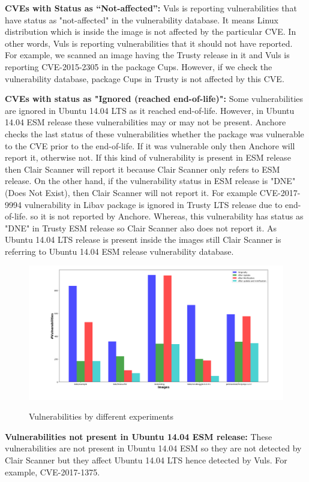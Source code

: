 \documentclass[a4paper,num-refs]{oup-contemporary}
\begin{document}
\textbf{CVEs with Status as “Not-affected”:} Vuls is reporting vulnerabilities that have status
as "not-affected" in the vulnerability database. It means Linux distribution which is inside the image is not affected
by the particular CVE. In other words, Vuls is reporting vulnerabilities that it should not have reported.
For example, we scanned an image having the Trusty release in it and Vuls is reporting CVE-2015-2305
in the package Cups. However, if we check the vulnerability database, package Cups in Trusty is not
affected by this CVE.

\textbf{CVEs with status as "Ignored (reached end-of-life)":}
Some vulnerabilities are ignored in Ubuntu 14.04 LTS as it reached end-of-life. 
However, in Ubuntu 14.04 ESM release these vulnerabilities may or may not be present.
Anchore checks the last status of these vulnerabilities whether the package was vulnerable to the CVE
prior to the end-of-life. If it was vulnerable only then Anchore will report it, otherwise not.
If this kind of vulnerability is present in ESM release then Clair Scanner will report it because Clair Scanner
only refers to ESM release. On the other hand, if the vulnerability
status in ESM release is "DNE" (Does Not Exist), then Clair Scanner will not report it. 
For example CVE-2017-9994 vulnerability in Libav package is ignored in Trusty LTS release due to end-of-life.
so it is not reported by Anchore. Whereas, this vulnerability has status as "DNE" in Trusty ESM
release so Clair Scanner also does not report it. As Ubuntu 14.04 LTS release is present inside the images still
Clair Scanner is referring to Ubuntu 14.04 ESM release vulnerability database.

\begin{figure}[b]
        {\includegraphics[scale=1.5,width=\textwidth]
        {Figures/bargraph.png}}
        \caption{\label{fig:bargraph} Vulnerabilities by different experiments}
      \end{figure}
\textbf{Vulnerabilities not present in Ubuntu 14.04 ESM release:} These vulnerabilities are not present in Ubuntu 14.04 ESM so they 
are not detected by Clair Scanner but they affect Ubuntu 14.04 LTS hence detected by Vuls. For example, CVE-2017-1375.
\end{document}
